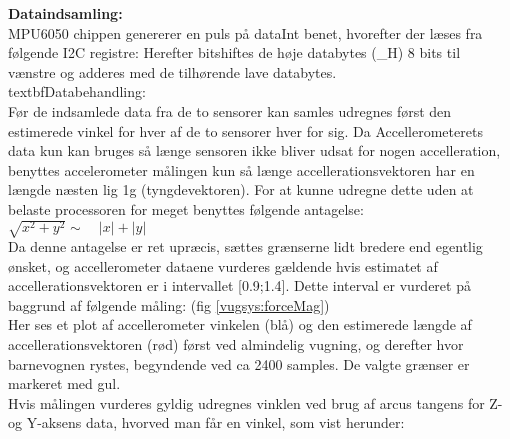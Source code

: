 \textbf{Dataindsamling:} \\
MPU6050 chippen genererer en puls på dataInt benet, hvorefter der læses fra følgende I2C registre:
Herefter bitshiftes de høje databytes (\_H) 8 bits til vænstre og adderes med de tilhørende lave databytes.\\
textbf{Databehandling:} \\

Før de indsamlede data fra de to sensorer kan samles udregnes først den estimerede vinkel for hver af de to sensorer hver for sig. Da Accellerometerets data kun kan bruges så længe sensoren ikke bliver udsat for nogen accelleration, benyttes accelerometer målingen kun så længe accellerationsvektoren har en længde næsten lig 1g (tyngdevektoren). For at kunne udregne dette uden at belaste processoren for meget benyttes følgende antagelse:\\
	$\sqrt { { x }^{ 2 }+{ y }^{ 2 } } \sim \quad \left| x \right| +\left| y \right|$ \\
Da denne antagelse er ret upræcis, sættes grænserne lidt bredere end egentlig ønsket, og accellerometer dataene vurderes gældende hvis estimatet af accellerationsvektoren er i intervallet [0.9;1.4]. Dette interval er vurderet på baggrund af følgende måling: (fig \ref{vugsys:forceMag})\\
Her ses et plot af accellerometer vinkelen (blå) og den estimerede længde af accellerationsvektoren (rød) først ved almindelig vugning, og derefter hvor barnevognen rystes, begyndende ved ca 2400 samples. De valgte grænser er markeret med gul.\\
Hvis målingen vurderes gyldig udregnes vinklen ved brug af arcus tangens for Z- og Y-aksens data, hvorved man får en vinkel, som vist herunder:\\
